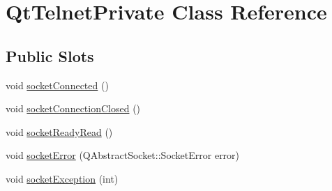 \hypertarget{classQtTelnetPrivate}{
\section{QtTelnetPrivate Class Reference}
\label{classQtTelnetPrivate}
}
\subsection*{Public Slots}
\begin{DoxyCompactItemize}
\item 
void \hyperlink{classQtTelnetPrivate_ac4be71355182f5fd94ba3470c9735f04}{socketConnected} ()
\item 
void \hyperlink{classQtTelnetPrivate_ae58ae8a85e306d69e8f0c2319784341e}{socketConnectionClosed} ()
\item 
void \hyperlink{classQtTelnetPrivate_a460c21d4294b03c64c4a63f703d474aa}{socketReadyRead} ()
\item 
void \hyperlink{classQtTelnetPrivate_ae6898112df89f6e96f465865e5d653eb}{socketError} (QAbstractSocket::SocketError error)
\item 
void \hyperlink{classQtTelnetPrivate_afc8a54ee4ba780dfa5f0a9e6019047c7}{socketException} (int)
\end{DoxyCompactItemize}
